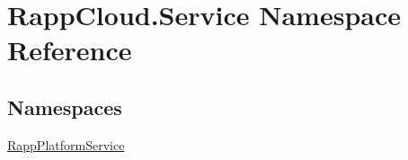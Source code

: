 \hypertarget{namespaceRappCloud_1_1Service}{\section{Rapp\-Cloud.\-Service Namespace Reference}
\label{namespaceRappCloud_1_1Service}
}
\subsection*{Namespaces}
\begin{DoxyCompactItemize}
\item 
\hyperlink{namespaceRappCloud_1_1Service_1_1RappPlatformService}{Rapp\-Platform\-Service}
\end{DoxyCompactItemize}
